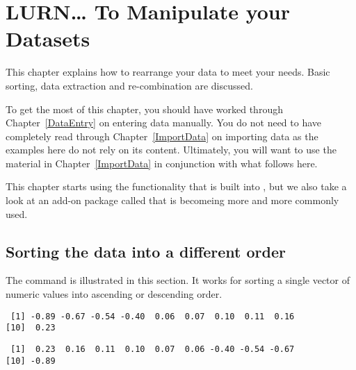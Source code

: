 

 
\chapter{LURN\ldots{} To Manipulate your Datasets} 
\label{Manipulate} 
 

 
This chapter explains how to rearrange your data to meet your needs. Basic sorting, data extraction and re-combination are discussed. 
 
To get the most of this chapter, you should have worked through Chapter~\ref{DataEntry} on entering data manually. You do not need to have completely read through Chapter~\ref{ImportData} on importing data as the examples here do not rely on its content. Ultimately, you will want to use the material in Chapter~\ref{ImportData} in conjunction with what follows here. 
 
 
This chapter starts using the functionality that is built into \R{}, but we also take a look at an add-on package called  that is becomeing more and more commonly used. 
 
\section{Sorting the data into a different order} 
 
The  command is illustrated in this section. It works for sorting a single vector of numeric values into ascending or descending order. 
\begin{knitrout}
\color{fgcolor}\begin{kframe}
\begin{alltt}
\hlstd{> }\hlkwb{=}\hlstd{(}\hlstd{(}\hlstd{),}\hlstd{)}
\hlstd{> }
\end{alltt}
\begin{verbatim}
 [1] -0.89 -0.67 -0.54 -0.40  0.06  0.07  0.10  0.11  0.16
[10]  0.23
\end{verbatim}
\begin{alltt}
\hlstd{> } \hlstd{=}\hlstd{)}
\end{alltt}
\begin{verbatim}
 [1]  0.23  0.16  0.11  0.10  0.07  0.06 -0.40 -0.54 -0.67
[10] -0.89
\end{verbatim}
\end{kframe}
\end{knitrout}
 
